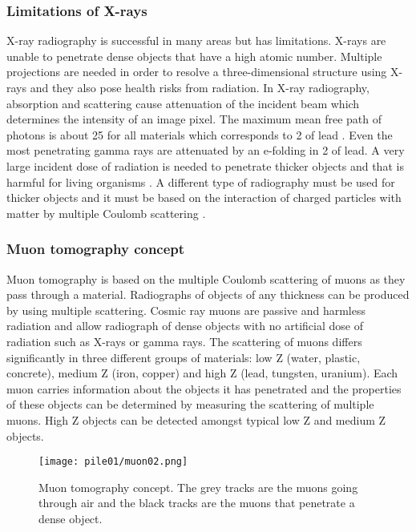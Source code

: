 \documentclass[twoside,titlepage,11pt,twocolumn,a4paper]{article}
\begin{document}
\subsubsection{Limitations of X-rays}
X-ray radiography is successful in many areas but has
limitations. X-rays are unable to penetrate dense objects that have a
high atomic number. Multiple projections are needed in order to
resolve a three-dimensional structure using X-rays and they also pose
health risks from radiation. In X-ray radiography, absorption and
scattering cause attenuation of the incident beam which determines the
intensity of an image pixel. The maximum mean free path of photons is
about \unit{25}{\gram\usk\rpsquare{\centi\metre}} for all materials
which corresponds to \unit{2}{\centi\metre} of lead
\citep{Borozdin2003}. Even the most penetrating gamma rays are
attenuated by an e-folding in \unit{2}{\centi\metre} of lead. A very
large incident dose of radiation is needed to penetrate thicker
objects and that is harmful for living organisms
\citep{Priedhorsky2003}. A different type of radiography must be used
for thicker objects and it must be based on the interaction of charged
particles with matter by multiple Coulomb scattering
\citep{Borozdin2003}.

\subsubsection{Muon tomography concept}
Muon tomography is based on the multiple Coulomb scattering of muons
as they pass through a material. Radiographs of objects of any
thickness can be produced by using multiple scattering.  Cosmic ray
muons are passive and harmless radiation and allow radiograph of dense
objects with no artificial dose of radiation such as X-rays or gamma
rays. The scattering of muons differs significantly in three different
groups of materials: low Z (water, plastic, concrete), medium Z (iron,
copper) and high Z (lead, tungsten, uranium)\citep{imageRec2004}. Each
muon carries information about the objects it has penetrated and the
properties of these objects can be determined by measuring the
scattering of multiple muons. High Z objects can be detected amongst
typical low Z and medium Z objects. \citep{statisticalRec2007}

\begin{figure}
  \texttt{[image: pile01/muon02.png]}
  \caption{Muon tomography concept. The grey tracks are the muons
    going through air and the black tracks are the muons that
    penetrate a dense object. \citep{statisticalRec2007}}
  \label{fig:muon02}
\end{figure}
\end{document}

